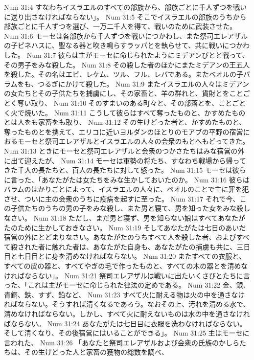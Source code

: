 Num 31:4  すなわちイスラエルのすべての部族から、部族ごとに千人ずつを戦いに送り出さなければならない」。
Num 31:5  そこでイスラエルの部族のうちから部族ごとに千人ずつを選び、一万二千人を得て、戦いのために武装させた。
Num 31:6  モーセは各部族から千人ずつを戦いにつかわし、また祭司エレアザルの子ピネハスに、聖なる器と吹き鳴らすラッパとを執らせて、共に戦いにつかわした。
Num 31:7  彼らは主がモーセに命じられたようにミデアンびとと戦って、その男子をみな殺した。
Num 31:8  その殺した者のほかにまたミデアンの王五人を殺した。その名はエビ、レケム、ツル、フル、レバである。またベオルの子バラムをも、つるぎにかけて殺した。
Num 31:9  またイスラエルの人々はミデアンの女たちとその子供たちを捕虜にし、その家畜と、羊の群れと、貨財とをことごとく奪い取り、
Num 31:10  そのすまいのある町々と、その部落とを、ことごとく火で焼いた。
Num 31:11  こうして彼らはすべて奪ったものと、かすめたものとは人をも家畜をも取り、
Num 31:12  その生けどった者と、かすめたものと、奪ったものとを携えて、エリコに近いヨルダンのほとりのモアブの平野の宿営におるモーセと祭司エレアザルとイスラエルの人々の会衆のもとへもどってきた。
Num 31:13  ときにモーセと祭司エレアザルと会衆のつかさたちはみな宿営の外に出て迎えたが、
Num 31:14  モーセは軍勢の将たち、すなわち戦場から帰ってきた千人の長たちと、百人の長たちに対して怒った。
Num 31:15  モーセは彼らに言った、「あなたがたは女たちをみな生かしておいたのか。
Num 31:16  彼らはバラムのはかりごとによって、イスラエルの人々に、ペオルのことで主に罪を犯させ、ついに主の会衆のうちに疫病を起すに至った。
Num 31:17  それで今、この子供たちのうちの男の子をみな殺し、また男と寝て、男を知った女をみな殺しなさい。
Num 31:18  ただし、まだ男と寝ず、男を知らない娘はすべてあなたがたのために生かしておきなさい。
Num 31:19  そしてあなたがたは七日のあいだ宿営の外にとどまりなさい。あなたがたのうちすべて人を殺した者、およびすべて殺された者に触れた者は、あなたがた自身も、あなたがたの捕虜も共に、三日目と七日目とに身を清めなければならない。
Num 31:20  またすべての衣服と、すべての皮の器と、すべてやぎの毛で作ったものと、すべての木の器とを清めなければならない」。
Num 31:21  祭司エレアザルは戦いに出たいくさびとたちに言った、「これは主がモーセに命じられた律法の定めである。
Num 31:22  金、銀、青銅、鉄、すず、鉛など、
Num 31:23  すべて火に耐える物は火の中を通さなければならない。そうすれば清くなるであろう。なおその上、汚れを清める水で、清めなければならない。しかし、すべて火に耐えないものは水の中を通さなければならない。
Num 31:24  あなたがたは七日目に衣服を洗わなければならない。そして清くなり、その後宿営にはいることができる」。
Num 31:25  主はモーセに言われた、
Num 31:26  「あなたと祭司エレアザルおよび会衆の氏族のかしらたちは、その生けどった人と家畜の獲物の総数を調べ、
